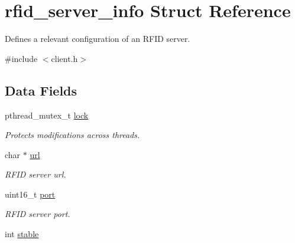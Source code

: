 \hypertarget{structrfid__server__info}{
\section{rfid\_\-server\_\-info Struct Reference}
\label{structrfid__server__info}
}


Defines a relevant configuration of an RFID server.  




{\ttfamily \#include $<$client.h$>$}

\subsection*{Data Fields}
\begin{DoxyCompactItemize}
\item 
pthread\_\-mutex\_\-t \hyperlink{structrfid__server__info_a0abaf4b5d42c4e5d19190035fade3599}{lock}
\begin{DoxyCompactList}\small\item\em Protects modifications across threads. \item\end{DoxyCompactList}\item 
\hypertarget{structrfid__server__info_ab135e5154c1828bef226a3df98ee3333}{
char $\ast$ \hyperlink{structrfid__server__info_ab135e5154c1828bef226a3df98ee3333}{url}}
\label{structrfid__server__info_ab135e5154c1828bef226a3df98ee3333}

\begin{DoxyCompactList}\small\item\em RFID server url. \item\end{DoxyCompactList}\item 
\hypertarget{structrfid__server__info_a8e0798404bf2cf5dabb84c5ba9a4f236}{
uint16\_\-t \hyperlink{structrfid__server__info_a8e0798404bf2cf5dabb84c5ba9a4f236}{port}}
\label{structrfid__server__info_a8e0798404bf2cf5dabb84c5ba9a4f236}

\begin{DoxyCompactList}\small\item\em RFID server port. \item\end{DoxyCompactList}\item 
\hypertarget{structrfid__server__info_a546501ce6bc6047dd53694411b4aa185}{
int \hyperlink{structrfid__server__info_a546501ce6bc6047dd53694411b4aa185}{stable}}
\label{structrfid__server__info_a546501ce6bc6047dd53694411b4aa185}


\end{DoxyCompactItemize}
